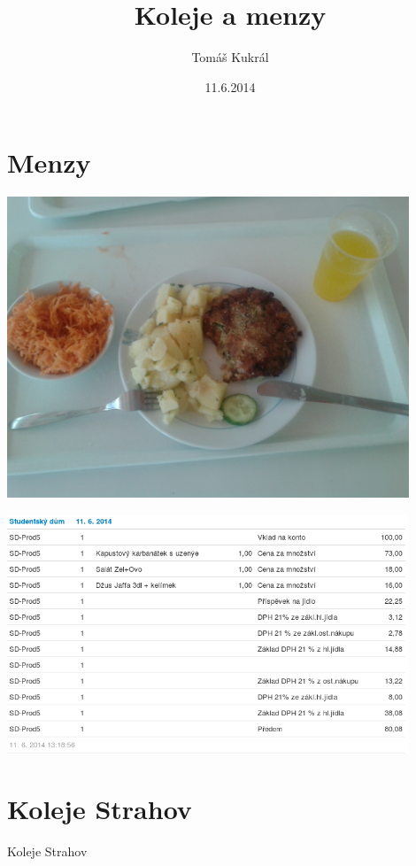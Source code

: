 \documentclass{beamer}
\author[Tomáš Kukrál]{Tomáš Kukrál}
\institute[tech@SU]{Studentská unie ČVUT - klub tech@SU}
\title[Koleje a menzy]{Koleje a menzy}
\date{11.6.2014}
\begin{document}
\begin{frame}
	\titlepage
\end{frame}

\section{Menzy}
\begin{frame}
	\begin{center}
	\includegraphics[width=0.9\textwidth]{obed_foto.jpg}
	\end{center}
\end{frame}

\begin{frame}
	\begin{center}
	\includegraphics[width=0.9\textwidth]{obed_cena.png}
	\end{center}
\end{frame}

\section{Koleje Strahov}
\begin{frame}{Koleje Strahov}
\end{frame}
\end{document}
